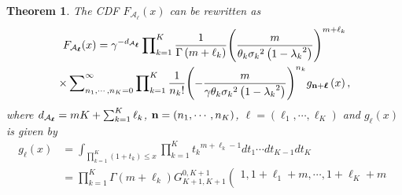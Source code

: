 \documentclass[12pt,onecolumn,draftcls]{IEEEtran}
\newcommand{\bs}{\boldsymbol}
\newtheorem{theorem}{Theorem}
\begin{document}
\begin{theorem} \label{lemma:lemma_gener_fox_H}
The CDF ${F_{{{ {\mathcal A}}_{\bs{\ell}}}}}(x)$ can be rewritten as
\begin{multline}\label{eqn:der_A_1_CDF}
{F_{{{\cal A}_{\bs{\ell}}}}}(x) = {\gamma ^{-d_{{ {\cal A}_{\bs{\ell}}}}}}\prod\nolimits_{k = 1}^K {\frac{1}{{\Gamma \left( {m + {\ell_k}} \right)}}{{\left( {\frac{m}{{{\theta _k}{\sigma _k}^2\left( {1 - {\lambda _k}^2} \right)}}} \right)}^{m + {\ell_k}}}} \\
\times \sum\nolimits_{{n_1}, \cdots ,{n_K} = 0}^\infty  {\prod\nolimits_{k = 1}^K {\frac{1}{{{n_k}!}}{{\left( { - \frac{m}{{\gamma {\theta _k}{\sigma _k}^2\left( {1 - {\lambda _k}^2} \right)}}} \right)}^{{n_k}}}} } {g_{{\bf{n}} + {\bs{\ell}}}}\left( x \right),
\end{multline}
where $d_{{ {\cal A}_{\bs{\ell}}}} = mK + \sum\nolimits_{k = 1}^K { { {\ell_k}} }$, ${\bf n} = (n_1,\cdots,n_K)$, ${{\bs{\ell}}} = (\ell_1,\cdots,\ell_K)$ and ${g_{{\bs{\ell}}}}\left( x \right)$ is given by
\begin{align}\label{eqn:sec_def_g_fun}
{g_{\bs{\ell}}}\left( x \right) &= \int\nolimits_{\prod\nolimits_{k = 1}^K {\left( {1 + {t_k}} \right)}  \le x} {\prod\limits_{k = 1}^K {{t_k}^{m + {\ell_k} - 1}} d{t_1} \cdots d{t_{K - 1}}d{t_K}}\\
\label{eqn:g_0_0_der_meij_rem}
&= \prod\limits_{k = 1}^K {\Gamma \left( {m + {\ell_k}} \right)} G_{K + 1,K + 1}^{0,K + 1}\left( {\left. {\begin{array}{*{20}{c}}
{1,1 + {\ell_1} + m, \cdots ,1 + {\ell_K} + m}\\

\end{array}}}
\end{align}
\end{theorem}
\end{document}
